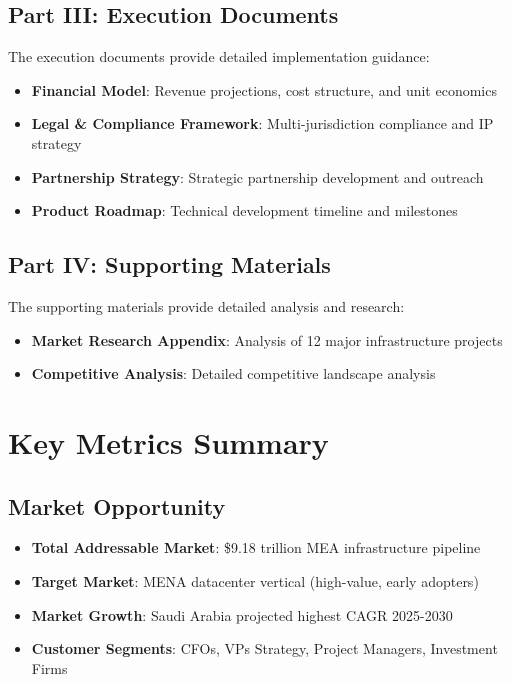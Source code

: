 \documentclass[11pt,a4paper]{book}
\begin{document}
\section{Part III: Execution Documents}
The execution documents provide detailed implementation guidance:
\begin{itemize}
    \item \textbf{Financial Model}: Revenue projections, cost structure, and unit economics
    \item \textbf{Legal \& Compliance Framework}: Multi-jurisdiction compliance and IP strategy
    \item \textbf{Partnership Strategy}: Strategic partnership development and outreach
    \item \textbf{Product Roadmap}: Technical development timeline and milestones
\end{itemize}

\section{Part IV: Supporting Materials}
The supporting materials provide detailed analysis and research:
\begin{itemize}
    \item \textbf{Market Research Appendix}: Analysis of 12 major infrastructure projects
    \item \textbf{Competitive Analysis}: Detailed competitive landscape analysis
\end{itemize}

\chapter{Key Metrics Summary}
\label{app:key-metrics}

\section{Market Opportunity}
\begin{itemize}
    \item \textbf{Total Addressable Market}: \$9.18 trillion MEA infrastructure pipeline
    \item \textbf{Target Market}: MENA datacenter vertical (high-value, early adopters)
    \item \textbf{Market Growth}: Saudi Arabia projected highest CAGR 2025-2030
    \item \textbf{Customer Segments}: CFOs, VPs Strategy, Project Managers, Investment Firms
\end{itemize}
\end{document}
